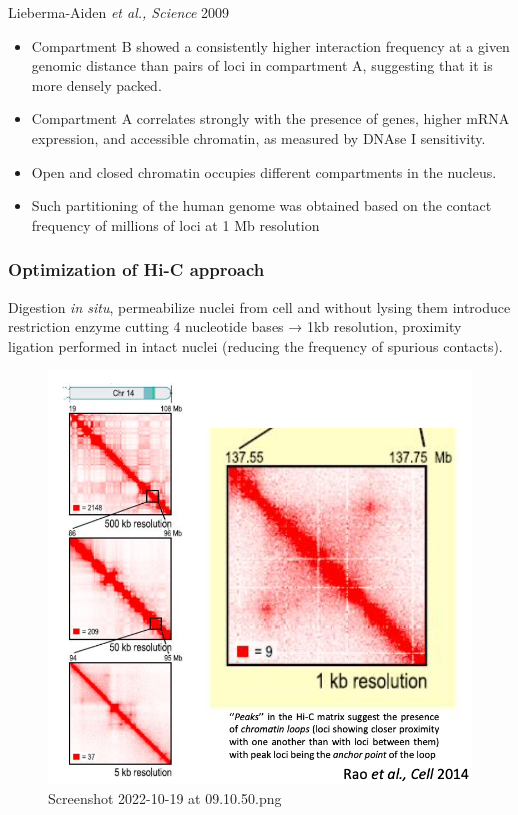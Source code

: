 Lieberma-Aiden \emph{et al., Science} 2009

\begin{itemize}
\tightlist
\item
  Compartment B showed a consistently higher interaction frequency at a given genomic distance than pairs of loci in compartment A, suggesting that it is more densely packed.
\item
  Compartment A correlates strongly with the presence of genes, higher mRNA expression, and accessible chromatin, as measured by DNAse I sensitivity.
\item
  Open and closed chromatin occupies different compartments in the nucleus.
\item
  Such partitioning of the human genome was obtained based on the contact frequency of millions of loci at 1 Mb resolution
\end{itemize}

\hypertarget{optimization-of-hi-c-approach}{%
\subsubsection{Optimization of Hi-C approach}\label{optimization-of-hi-c-approach}}

Digestion \emph{in situ}, permeabilize nuclei from cell and without lysing them introduce restriction enzyme cutting 4 nucleotide bases → 1kb resolution, proximity ligation performed in intact nuclei (reducing the frequency of spurious contacts).

\begin{figure}
\centering
\includegraphics[width=\textwidth]{../_resources/Screenshot_2022-10-19_at_09-10-50.png}
\caption{Screenshot 2022-10-19 at 09.10.50.png}
\end{figure}

